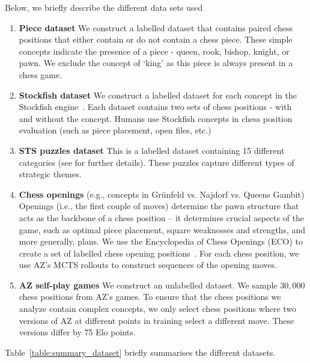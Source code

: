 \documentclass{article}
\begin{document}
Below, we briefly describe the different data sets used
\begin{enumerate}
\item \textbf{Piece dataset} We construct a labelled dataset that contains paired chess positions that either contain or do not contain a chess piece. These simple concepts indicate the presence of a piece - queen, rook, bishop, knight, or pawn. We exclude the concept of `king' as this piece is always present in a chess game.
    \item \textbf{Stockfish dataset} We construct a labelled dataset for each concept in the Stockfish engine~\citep{stockfish}. Each dataset contains two sets of chess positions -  with and without the concept. Humans use Stockfish concepts  in chess position evaluation (such as piece placement, open files, etc.) 
    \item \textbf{STS puzzles dataset} This is a labelled dataset containing 15 different categories (see \cite{sts} for further details). These puzzles capture different types of strategic themes.
    \item \textbf{Chess openings} (e.g., concepts in Grünfeld vs. Najdorf vs. Queens Gambit) Openings (i.e., the first couple of moves) determine the pawn structure that acts as the backbone of a chess position -- it determines crucial aspects of the game, such as optimal piece placement, square weaknesses and strengths, and more generally, plans. We use the Encyclopedia of Chess Openings (ECO) to create a set of labelled chess opening positions~\citep{eco}. For each chess position, we use AZ's MCTS rollouts to construct sequences of the opening moves. 
    \item \textbf{AZ self-play games} We construct an unlabelled dataset. We sample $30,000$ chess positions from AZ's games. To ensure that the chess positions we analyze contain complex concepts,
    we only select chess positions where two versions of AZ at different points in training select a different move. These versions differ by 75 Elo points. 
\end{enumerate}
Table~\ref{table:summary_dataset} briefly summarises the different datasets. 
\end{document}
